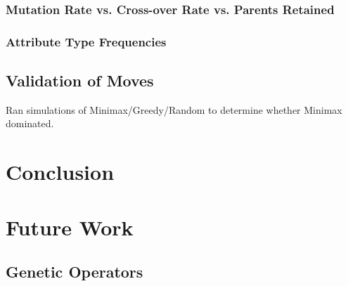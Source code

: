 \documentclass{acm_proc_article-sp}
\begin{document}
        \subsubsection{Mutation Rate vs. Cross-over Rate vs. Parents Retained}
        \subsubsection{Attribute Type Frequencies}
    
    \subsection{Validation of Moves}
        
        Ran simulations of Minimax/Greedy/Random to determine whether Minimax dominated.

\section{Conclusion}

    
\section{Future Work}

    \subsection{Genetic Operators}


%


\begin{thebibliography}{1}


\end{thebibliography}


\balancecolumns
\end{document}
